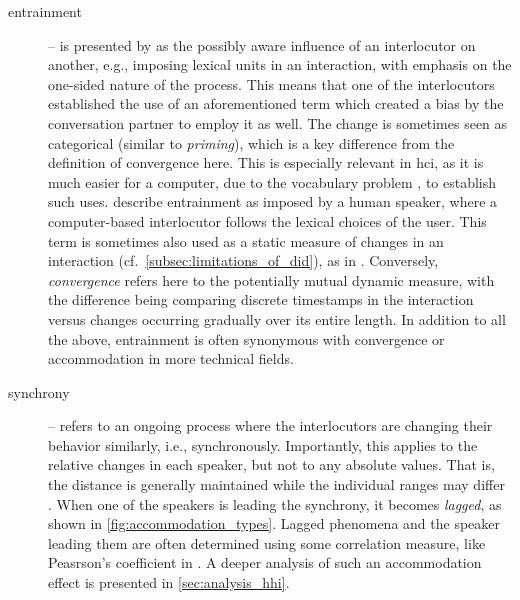 \begin{description}
	\item[entrainment] -- is presented by \citet{Brennan1996lexical} as the possibly aware influence of an interlocutor on another, e.g., imposing lexical units in an interaction, with emphasis on the one-sided nature of the process.
	This means that one of the interlocutors established the use of an aforementioned term which created a bias by the conversation partner to employ it as well.
	The change is sometimes seen as categorical (similar to \textit{priming}), which is a key difference from the definition of convergence here.
	This is especially relevant in \ac{hci}, as it is much easier for a computer, due to the vocabulary problem \citep{Furnas1987vocabulary}, to establish such uses.
	\citet{Lopes2013automated} describe entrainment as imposed by a human speaker, where a computer-based interlocutor follows the lexical choices of the user.
	This term is sometimes also used as a static measure of changes in an interaction (cf.\ \cref{subsec:limitations_of_did}), as in \citet{Levitan2013entrainment}.
	Conversely, \emph{convergence} refers here to the potentially mutual dynamic measure, with the difference being comparing discrete timestamps in the interaction \citep[for example, between two halves of a session, as done by][]{Xia2014prosodic} versus changes occurring gradually over its entire length.
	In addition to all the above, entrainment is often synonymous with convergence or accommodation in more technical fields.
	
	\item[synchrony] -- refers to an ongoing process where the interlocutors are changing their behavior similarly, i.e., synchronously.
	Importantly, this applies to the relative changes in each speaker, but not to any absolute values.
	That is, the distance is generally maintained while the individual ranges may differ \citep[see example in \cref{fig:synchrony_switchboard} on page~\pageref{fig:synchrony_switchboard} and Figure 1 in][]{Levitan2011measuring}.
	When one of the speakers is leading the synchrony, it becomes \emph{lagged}, as shown in \cref{fig:accommodation_types}.
	Lagged phenomena and the speaker leading them are often determined using some correlation measure, like Peasrson's coefficient in \citet{Edlund2009pause, Xia2014prosodic}.
	A deeper analysis of such an accommodation effect is presented in \cref{sec:analysis_hhi}.
	

\end{description}
